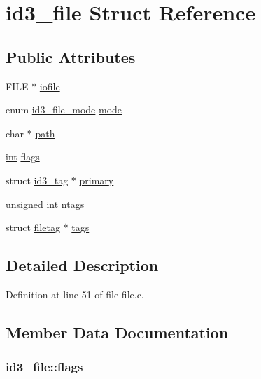 \hypertarget{structid3__file}{}\section{id3\+\_\+file Struct Reference}
\label{structid3__file}
\subsection*{Public Attributes}
\begin{DoxyCompactItemize}
\item 
F\+I\+LE $\ast$ \hyperlink{structid3__file_acb370428b9f0cf6764e27e1c3adce714}{iofile}
\item 
enum \hyperlink{id3tag_8h_a69d0fb5eed6714f55d863a2d0e148ac4}{id3\+\_\+file\+\_\+mode} \hyperlink{structid3__file_a64ac6baf94c23e214b857faff9006998}{mode}
\item 
char $\ast$ \hyperlink{structid3__file_a84f186fde30a49bda7c3af4400ff1792}{path}
\item 
\hyperlink{xmltok_8h_a5a0d4a5641ce434f1d23533f2b2e6653}{int} \hyperlink{structid3__file_af48b303560d1b188d68ce30143623ab5}{flags}
\item 
struct \hyperlink{structid3__tag}{id3\+\_\+tag} $\ast$ \hyperlink{structid3__file_a51e2c5f377940144b340fc5fcf8d773d}{primary}
\item 
unsigned \hyperlink{xmltok_8h_a5a0d4a5641ce434f1d23533f2b2e6653}{int} \hyperlink{structid3__file_ae2fd27e36e8d70ce01c12eae2e297d0e}{ntags}
\item 
struct \hyperlink{structfiletag}{filetag} $\ast$ \hyperlink{structid3__file_afb17612b7d876d4372c36475aa1d21bf}{tags}
\end{DoxyCompactItemize}


\subsection{Detailed Description}


Definition at line 51 of file file.\+c.



\subsection{Member Data Documentation}
\subsubsection[{\texorpdfstring{flags}{flags}}]{ id3\+\_\+file\+::flags}\hypertarget{structid3__file_af48b303560d1b188d68ce30143623ab5}{}\label{structid3__file_af48b303560d1b188d68ce30143623ab5}


